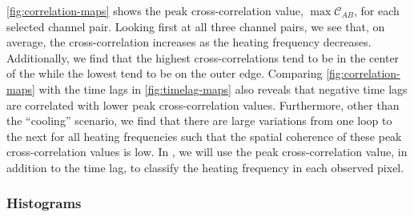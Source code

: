 \autoref{fig:correlation-maps} shows the peak cross-correlation value, $\max\mathcal{C}_{AB}$, for each selected channel pair. Looking first at all three channel pairs, we see that, on average, the cross-correlation increases as the heating frequency decreases. Additionally, we find that the highest cross-correlations tend to be in the center of the \AR{} while the lowest tend to be on the outer edge. Comparing \autoref{fig:correlation-maps} with the time lags in \autoref{fig:timelag-maps} also reveals that negative time lags are correlated with lower peak cross-correlation values. Furthermore, other than the ``cooling'' scenario, we find that there are large variations from one loop to the next for all heating frequencies such that the spatial coherence of these peak cross-correlation values is low. In , we will use the peak cross-correlation value, in addition to the time lag, to classify the heating frequency in each observed pixel.

\subsubsection{Histograms}\label{histograms}

